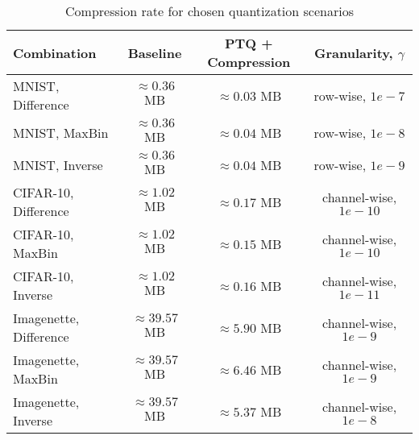 \begin{table}[t!]
  \centering
  \caption{Compression rate for chosen quantization scenarios}
  \label{tab:losscomrpessionrate}
  \begin{tabular}{lccc}
      \toprule
      \textbf{Combination}     & \textbf{Baseline} & \textbf{PTQ + Compression} & \textbf{Granularity, $\gamma$} \\ 
      \midrule
      MNIST, Difference               & $\approx 0.36 $ MB            & $\approx 0.03 $ MB              & row-wise, $1e-7$         \\ 
      MNIST, MaxBin               & $\approx 0.36 $ MB             & $\approx 0.04 $ MB             &  row-wise, $ 1e-8$           \\ 
      MNIST, Inverse               & $\approx 0.36 $ MB            & $\approx 0.04 $ MB             &  row-wise, $1e-9$          \\ 
      CIFAR-10, Difference          &  $\approx 1.02 $ MB          & $\approx 0.17 $ MB            & channel-wise, $1e-10$            \\ 
      CIFAR-10, MaxBin               &  $\approx 1.02 $ MB            & $\approx 0.15 $ MB              &channel-wise, $ 1e-10$          \\ 
      CIFAR-10, Inverse               &  $\approx 1.02 $ MB            &$\approx 0.16 $ MB              &channel-wise, $1e-11$           \\ 
      Imagenette, Difference               &  $\approx 39.57 $ MB            & $\approx 5.90 $ MB              &channel-wise, $ 1e-9$            \\ 
      Imagenette, MaxBin               &  $\approx 39.57 $ MB        & $\approx 6.46 $ MB             & channel-wise, $1e-9$            \\ 
      Imagenette, Inverse               &  $\approx 39.57 $ MB          & $\approx 5.37 $ MB             & channel-wise, $1e-8$          \\ 

      \bottomrule
  \end{tabular}
  \vspace{1.0em}
\end{table}